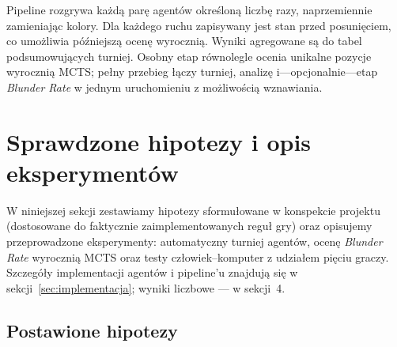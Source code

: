 \documentclass[11pt, a4paper]{article}
\begin{document}
Pipeline rozgrywa każdą parę agentów określoną liczbę razy, naprzemiennie zamieniając kolory. Dla każdego ruchu zapisywany jest stan przed posunięciem, co umożliwia późniejszą ocenę wyrocznią. Wyniki agregowane są do tabel podsumowujących turniej. Osobny etap równolegle ocenia unikalne pozycje wyrocznią MCTS; pełny przebieg łączy turniej, analizę i---opcjonalnie---etap \textit{Blunder Rate} w jednym uruchomieniu z możliwością wznawiania.

\section{Sprawdzone hipotezy i opis eksperymentów}
\label{sec:hipotezy}

W niniejszej sekcji zestawiamy hipotezy sformułowane w konspekcie projektu (dostosowane do faktycznie zaimplementowanych reguł gry) oraz opisujemy przeprowadzone eksperymenty: automatyczny turniej agentów, ocenę \textit{Blunder Rate} wyrocznią MCTS oraz testy człowiek--komputer z udziałem pięciu graczy. Szczegóły implementacji agentów i pipeline'u znajdują się w sekcji~\ref{sec:implementacja}; wyniki liczbowe --- w sekcji~4.

\subsection{Postawione hipotezy}
\label{sec:hipotezy-sformulowanie}
\end{document}
